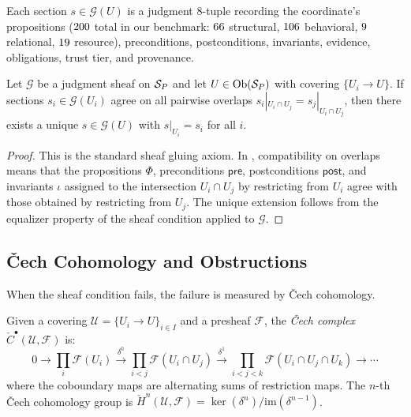\documentclass[11pt]{article}
\newcommand{\props}{\Phi}                           %
\newcommand{\precond}{\mathsf{pre}}                  %
\newcommand{\postcond}{\mathsf{post}}                %
\newcommand{\inv}{\iota}                             %
\newcommand{\im}{\mathrm{im}}                       %
\newcommand{\CechCpx}{\check{C}^{\bullet}}          %
\begin{document}
Each section $s \in \mathcal{G}(U)$ is a judgment 8-tuple recording the
coordinate's propositions ($200$ total in our benchmark:
$66$ structural, $106$
behavioral, $9$ relational,
$19$ resource), preconditions, postconditions,
invariants, evidence, obligations, trust tier, and provenance.

\begin{proposition}\label{prop:sheaf-extension}
Let $\mathcal{G}$ be a judgment sheaf on $\mathcal{S}_P$ and let
$U \in \mathrm{Ob}(\mathcal{S}_P)$ with covering $\{U_i \to U\}$.  If sections
$s_i \in \mathcal{G}(U_i)$ agree on all pairwise overlaps
$s_i|_{U_i \cap U_j} = s_j|_{U_i \cap U_j}$, then there exists a
unique $s \in \mathcal{G}(U)$ with $s|_{U_i} = s_i$ for all $i$.
\end{proposition}

\begin{proof}
This is the standard sheaf gluing axiom.  In \JuGeo, compatibility on
overlaps means that the propositions $\props$, preconditions $\precond$,
postconditions $\postcond$, and invariants $\inv$ assigned to the
intersection $U_i \cap U_j$ by restricting from $U_i$ agree with those
obtained by restricting from $U_j$.  The unique extension follows from
the equalizer property of the sheaf condition applied to $\mathcal{G}$.
\end{proof}

\subsection{Čech Cohomology and Obstructions}\label{ssec:cech-cohomology}

When the sheaf condition fails, the failure is measured by Čech
cohomology.

\begin{definition}\label{def:cech-complex}
Given a covering $\mathcal{U} = \{U_i \to U\}_{i \in I}$ and a
presheaf $\mathcal{F}$, the \emph{Čech complex}
$\CechCpx(\mathcal{U}, \mathcal{F})$ is:
\[
  0 \to \prod_{i} \mathcal{F}(U_i)
    \xrightarrow{\;\delta^0\;}
    \prod_{i < j} \mathcal{F}(U_i \cap U_j)
    \xrightarrow{\;\delta^1\;}
    \prod_{i < j < k} \mathcal{F}(U_i \cap U_j \cap U_k)
    \to \cdots
\]
where the coboundary maps are alternating sums of restriction maps.
The $n$-th Čech cohomology group is
$\check{H}^n(\mathcal{U}, \mathcal{F}) =
\ker(\delta^n) / \im(\delta^{n-1})$.
\end{definition}
\end{document}
